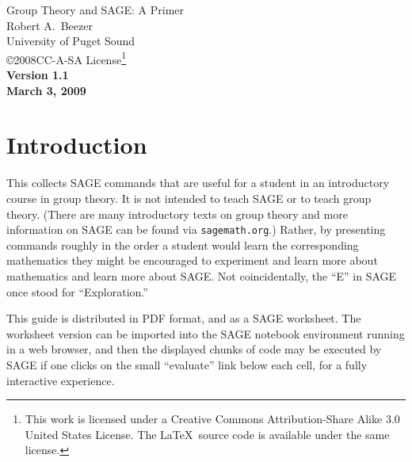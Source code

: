 \documentclass[12pt]{article}
\begin{document}
%
\begin{center}
{\fontsize{18pt}{18pt}\selectfont Group Theory and SAGE: A Primer}\\
Robert A.\ Beezer\\
University of Puget Sound\\
\copyright 2008\quad CC-A-SA License\footnote[2]{%
This work is licensed under a Creative Commons Attribution-Share Alike 3.0 United States License. 
The \LaTeX\ source code is available under the same license.}\\[10pt]
{\bf Version 1.1\\
March 3, 2009}
\end{center}
\vspace*{18pt}
%
\section*{Introduction}
%
This  collects SAGE commands that are useful for a student in an introductory course in group theory.  It is not intended to teach SAGE or to teach group theory.  (There are many introductory texts on group theory and more information on SAGE can be found via {\tt sagemath.org}.) Rather, by presenting commands roughly in the order a student would learn the corresponding mathematics they might be encouraged to experiment and learn more about mathematics and learn more about SAGE.  Not coincidentally, the ``E'' in SAGE once stood for ``Exploration.''\par
%
This guide is distributed in PDF format, and as a SAGE worksheet.  The worksheet version can be imported into the SAGE notebook environment running in a web browser, and then the displayed chunks of code may be executed by SAGE if one clicks on the small ``evaluate'' link below each cell, for a fully interactive experience.
%
\end{document}
